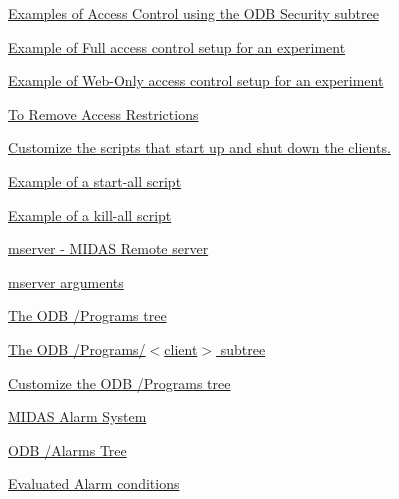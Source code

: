 \begin{TabularC}{2}
\begin{TabularC}{2}
\begin{DoxyItemize}
\begin{DoxyItemize}
\begin{DoxyItemize}
\begin{DoxyItemize}
\item \hyperlink{RC_customize_ODB_RC_Example_security}{Examples of Access Control using the ODB Security subtree} 
\begin{DoxyItemize}
\item \hyperlink{RC_customize_ODB_RC_Example_full_security}{Example of Full access control setup for an experiment} 
\item \hyperlink{RC_customize_ODB_RC_Example_web_security}{Example of Web-\/Only access control setup for an experiment} 
\end{DoxyItemize}
\item \hyperlink{RC_customize_ODB_RC_Remove_Security}{To Remove Access Restrictions} 
\end{DoxyItemize}
\end{DoxyItemize}
\item \hyperlink{RC_customize_ODB_RC_starting_clients}{Customize the scripts that start up and shut down the clients.} 
\begin{DoxyItemize}
\item \hyperlink{RC_customize_ODB_RC_start_all_example}{Example of a start-\/all script} 
\item \hyperlink{RC_customize_ODB_RC_kill_all_example}{Example of a kill-\/all script} 
\end{DoxyItemize}
\item \hyperlink{RC_customize_ODB_RC_mserver_utility}{mserver -\/ MIDAS Remote server} 
\begin{DoxyItemize}
\item \hyperlink{RC_customize_ODB_RC_mserver_arguments}{mserver arguments} 
\end{DoxyItemize}
\item \hyperlink{RC_customize_ODB_RC_ODB_Programs_Tree}{The ODB /Programs tree} 
\begin{DoxyItemize}
\item \hyperlink{RC_customize_ODB_RC_ODB_programs_client}{The ODB /Programs/$<$client$>$ subtree} 
\item \hyperlink{RC_customize_ODB_RC_customize_Programs_tree}{Customize the ODB /Programs tree} 
\end{DoxyItemize}
\item \hyperlink{RC_customize_ODB_RC_Alarm_System}{MIDAS Alarm System} 
\begin{DoxyItemize}
\item \hyperlink{RC_customize_ODB_RC_ODB_Alarms_Tree}{ODB /Alarms Tree} 
\begin{DoxyItemize}
\item \hyperlink{RC_customize_ODB_RC_evaluated_alarm_condition}{Evaluated Alarm conditions} 

\end{DoxyItemize}
\end{DoxyItemize}
\end{DoxyItemize}
\end{DoxyItemize}
\end{TabularC}
\end{TabularC}
